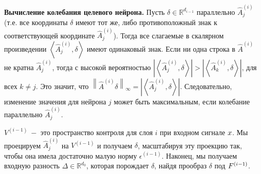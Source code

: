 \textbf{Вычисление колебания целевого нейрона.} Пусть $\delta \in \mathbb{R}^{d_{i-1}}$ параллельно $\hat{A}_{j}^{\left(i\right)}$ (т.е. все координаты $\delta$ имеют тот же, либо противоположный знак к соответствующей координате  $\hat{A}_{j}^{\left(i\right)}$). Тогда все слагаемые в скалярном произведении $\left \langle \hat{A}_{j}^{\left(i\right)}, \delta \right \rangle$ имеют одинаковый знак. Если ни одна строка в  $\hat{A}^{\left(i\right)}$ не кратна  $\hat{A}_{j}^{\left(i\right)}$, тогда с высокой вероятностью $\left | \left \langle \hat{A}_{j}^{\left(i\right)}, \delta \right \rangle \right | > \left | \left \langle \hat{A}_{k}^{\left(i\right)}, \delta \right \rangle \right |$, для всех $k \not = j.$ Это значит, что $\left \| \hat{A}^{\left(i\right)} \delta \right \|_{\infty} = \left | \left \langle \hat{A}_{j}^{\left(i\right)}, \delta \right \rangle \right |$. Следовательно, изменение значения для нейрона $j$ может быть максимальным, если колебание параллельно $ \hat{A}_{j}^{\left(i\right)}$.

$V^{\left(i-1\right)} ~-$ это пространство контроля для слоя $i$ при входном сигнале $\mathnormal{x}$. Мы проецируем $ \hat{A}_{j}^{\left(i\right)}$ на $V^{\left(i-1\right)}$ и получаем $\delta$, масштабируя эту проекцию так, чтобы она имела достаточно малую норму $\epsilon^{\left(i-1\right)}$. Наконец, мы получаем входную разность $\mathit{\Delta} \in \mathbb{R}^{d_{0}}$, которая порождает $\delta$, найдя прообраз $\delta$ под $\mathnormal{F}^{\left(i-1\right)}$.

